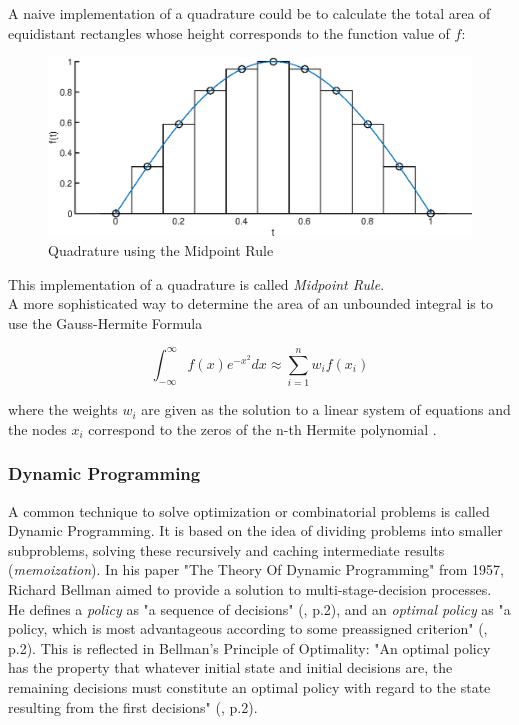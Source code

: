 \documentclass[12pt, a4paper, oneside]{article}
\begin{document}
A naive implementation of a quadrature could be to calculate the total area of equidistant rectangles whose height corresponds to the function value of $f$: 

	\begin{figure}[ht] 
		\includegraphics[width=1\textwidth]{figures/quadratureA.eps}
		\caption{Quadrature using the Midpoint Rule}
		\label{fig:quadrature-a}
	\end{figure}
This implementation of a quadrature is called \emph{Midpoint Rule}. 
\\

A more sophisticated way to determine the area of an unbounded integral is to use the Gauss-Hermite Formula

	\begin{equation}
	\int_{-\infty}^{\infty} f(x)e^{-x^2} dx \approx \sum_{i=1}^{n}{w_if(x_i)}
	\end{equation}

where the weights $w_i$ are given as the solution to a linear system of equations and the nodes $x_i$ correspond to the zeros of the n-th Hermite polynomial \citep{seminar:week6}.

\subsubsection{Dynamic Programming}

A common technique to solve optimization or combinatorial problems is called Dynamic Programming. 
It is based on the idea of dividing problems into smaller subproblems, solving these recursively and caching intermediate results (\textit{memoization}). %
In his paper "The Theory Of Dynamic Programming" from 1957, Richard Bellman aimed to provide a solution to multi-stage-decision processes. 
He defines a \textit{policy} as "a sequence of decisions" (\cite{bellman:1957}, p.2), and an \textit{optimal policy} as "a policy, which is most advantageous according to some preassigned criterion" (\cite{bellman:1957}, p.2). 
This is reflected in Bellman's Principle of Optimality: "An optimal policy has the property that whatever initial state and initial decisions are, the remaining decisions must constitute an optimal policy with regard to the state resulting from the first decisions" (\cite{bellman:1957}, p.2). 
\end{document}
